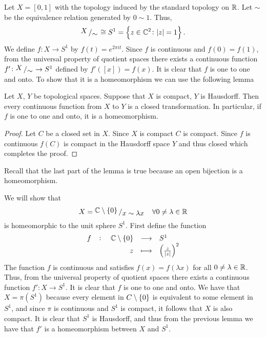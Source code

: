 \documentclass[11pt,a4paper]{article}
\begin{document}
\begin{example}
  Let $X = [0,1]$ with the topology induced by the standard topology on $\mathbb{R}$.
  Let $\sim$ be the equivalence relation generated by $0 \sim 1$.
  Thus,
  \[
    \bigslant{X}{\sim} \cong S^1 = \set{z \in \C^2 \colon |z| = 1}.
  \]
  We define $f \colon X \to S^1$ by $f(t) = e^{2 \pi i t}$.
  Since $f$ is continuous and $f(0) = f(1)$, from the universal property
  of quotient spaces there exists a continuous function 
  $f' \colon \bigslant{X}{\sim} \to S^1$ defined by $f'([x]) = f(x)$.
  It is clear that $f$ is one to one and onto.
  To show that it is a homeomorphism we can use the following lemma
  \begin{lemma}
    Let $X$, $Y$ be topological spaces.
    Suppose that $X$ is compact, $Y$ is Hausdorff.
    Then every continuous function from $X$ to $Y$ is a closed transformation.
    In particular, if $f$ is one to one and onto, it is a homeomorphism.
  \end{lemma}
  \begin{proof}
    Let $C$ be a closed set in $X$.
    Since $X$ is compact $C$ is compact.
    Since $f$ is continuous $f(C)$ is compact in the Hausdorff space $Y$
    and thus closed which completes the proof.
  \end{proof}
  \begin{remark}
    Recall that the last part of the lemma is true because an open bijection
    is a homeomorphism.
  \end{remark}
\end{example}

\begin{example}
  We will show that
  \[
    X = \bigslant{\C \setminus \set{0}}{x \sim \lambda x} \quad
    \forall 0 \neq \lambda \in \R
  \]
  is homeomorphic to the unit sphere $S^1$.
  First define the function
  \[
    \fullfunction{f}{\C \setminus \set{0}}{S^1}{z}{\del{\frac{z}{|z|}}^2}
  \]
  The function $f$ is continuous and satisfies $f(x) = f(\lambda x)$ for all
  $0 \neq \lambda \in \mathbb{R}$.
  Thus, from the universal property of quotient spaces there exists
  a continuous function $f' \colon X \to S^1$.
  It is clear that $f$ is one to one and onto.
  We have that $X = \pi(S^1)$ because every element in $C \setminus \set{0}$
  is equivalent to some element in $S^1$, and since $\pi$ is continuous
  and $S^1$ is compact, it follows that $X$ is also compact.
  It is clear that $S^1$ is Hausdorff, and thus from the previous lemma
  we have that $f'$ is a homeomorphism between $X$ and $S^1$.
\end{example}
\end{document}
